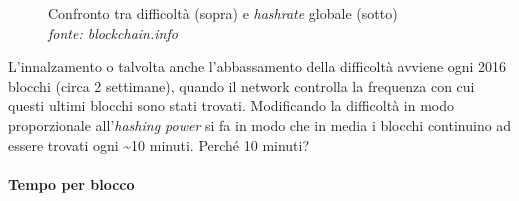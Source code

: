 \documentclass {article}
\begin{document}
\vspace {0.5cm}
\begin{figure}[htb!]
\captionsetup{width=1.4\linewidth}
\caption {Confronto tra difficoltà (sopra) e \textit{hashrate} globale (sotto)\\\textit{fonte: blockchain.info}}
\end{figure}
\vspace {0.2cm}
\noindent
%
L'innalzamento o talvolta anche l'abbassamento della difficoltà avviene ogni 2016 blocchi (circa 2 settimane), quando il network controlla la frequenza con cui questi ultimi blocchi sono stati trovati.
Modificando la difficoltà in modo proporzionale all'\textit{hashing power} si fa in modo che in media i blocchi continuino ad essere trovati ogni \textasciitilde 10 minuti. Perché 10 minuti?

\paragraph {Tempo per blocco}
\end{document}
